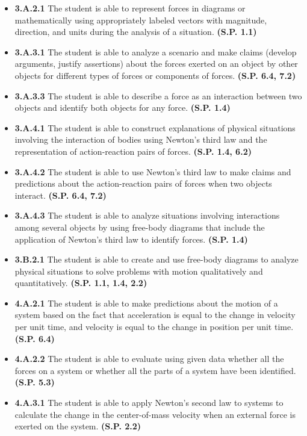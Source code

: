 \documentclass[
]{book}
\providecommand{\tightlist}{%
  \setlength{\itemsep}{0pt}\setlength{\parskip}{0pt}}
\begin{document}
\begin{itemize}
\tightlist
\item
  \textbf{3.A.2.1} The student is able to represent forces in diagrams or
  mathematically using appropriately labeled vectors with magnitude,
  direction, and units during the analysis of a situation. \textbf{(S.P.
  1.1)}
\item
  \textbf{3.A.3.1} The student is able to analyze a scenario and make
  claims (develop arguments, justify assertions) about the forces
  exerted on an object by other objects for different types of forces
  or components of forces. \textbf{(S.P. 6.4, 7.2)}
\item
  \textbf{3.A.3.3} The student is able to describe a force as an
  interaction between two objects and identify both objects for any
  force. \textbf{(S.P. 1.4)}
\item
  \textbf{3.A.4.1} The student is able to construct explanations of
  physical situations involving the interaction of bodies using
  Newton's third law and the representation of action-reaction pairs
  of forces. \textbf{(S.P. 1.4, 6.2)}
\item
  \textbf{3.A.4.2} The student is able to use Newton's third law to make
  claims and predictions about the action-reaction pairs of forces
  when two objects interact. \textbf{(S.P. 6.4, 7.2)}
\item
  \textbf{3.A.4.3} The student is able to analyze situations involving
  interactions among several objects by using free-body diagrams that
  include the application of Newton's third law to identify forces.
  \textbf{(S.P. 1.4)}
\item
  \textbf{3.B.2.1} The student is able to create and use free-body diagrams
  to analyze physical situations to solve problems with motion
  qualitatively and quantitatively. \textbf{(S.P. 1.1, 1.4, 2.2)}
\item
  \textbf{4.A.2.1} The student is able to make predictions about the motion
  of a system based on the fact that acceleration is equal to the
  change in velocity per unit time, and velocity is equal to the
  change in position per unit time. \textbf{(S.P. 6.4)}
\item
  \textbf{4.A.2.2} The student is able to evaluate using given data whether
  all the forces on a system or whether all the parts of a system have
  been identified. \textbf{(S.P. 5.3)}
\item
  \textbf{4.A.3.1} The student is able to apply Newton's second law to
  systems to calculate the change in the center-of-mass velocity when
  an external force is exerted on the system. \textbf{(S.P. 2.2)}
\end{itemize}
\end{document}
